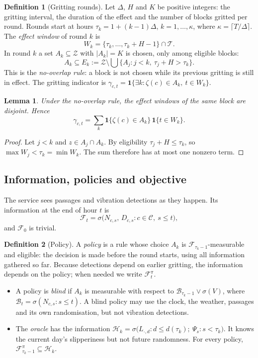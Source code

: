\documentclass[11pt,a4paper]{article}
\theoremstyle{plain}
\newtheorem{lemma}{Lemma}
\theoremstyle{definition}
\newtheorem{maaritelma}{Definition}
\theoremstyle{remark}
\newcommand{\cC}{\mathcal{C}}
\newcommand{\cZ}{\mathcal{Z}}
\newcommand{\cT}{\mathcal{T}}
\newcommand{\cF}{\mathcal{F}}
\newcommand{\cB}{\mathcal{B}}
\newcommand{\cH}{\mathcal{H}}
\newcommand{\1}{\mathbf{1}}
\begin{document}
\begin{maaritelma}[Gritting rounds]\label{maar:huolto}
Let $\Delta$, $H$ and $K$ be positive integers: the gritting interval, the
duration of the effect and the number of blocks gritted per round. Rounds start
at hours $\tau_k = 1 + (k-1)\Delta$, $k = 1, \dots, \kappa$, where
$\kappa = \lceil T/\Delta \rceil$. The \emph{effect window} of round $k$ is
\[
  W_k = \{\tau_k, \dots, \tau_k + H - 1\} \cap \cT.
\]
In round $k$ a set $A_k \subseteq \cZ$ with $|A_k| = K$ is chosen, only among
eligible blocks:
\[
  A_k \subseteq E_k := \cZ \setminus \bigcup\bigl\{A_j : j < k,\ \tau_j + H > \tau_k\bigr\}.
\]
This is the \emph{no-overlap rule}: a block is not chosen while its previous
gritting is still in effect. The gritting indicator is
$\gamma_{c,t} = \1\{\exists k : \zeta(c) \in A_k,\ t \in W_k\}$.
\end{maaritelma}

\begin{lemma}\label{le:erilliset}
Under the no-overlap rule, the effect windows of the same block are disjoint.
Hence
\[
  \gamma_{c,t} = \sum_{k} \1\{\zeta(c) \in A_k\}\, \1\{t \in W_k\}.
\]
\end{lemma}

\begin{proof}
Let $j < k$ and $z \in A_j \cap A_k$. By eligibility $\tau_j + H \le \tau_k$, so
$\max W_j < \tau_k = \min W_k$. The sum therefore has at most one nonzero term.
\end{proof}

\subsection{Information, policies and objective}

The service sees passages and vibration detections as they happen. Its
information at the end of hour $t$ is
\[
  \cF_t = \sigma\bigl(N_{c,s},\, D_{c,s} : c \in \cC,\ s \le t\bigr),
\]
and $\cF_0$ is trivial.

\begin{maaritelma}[Policy]\label{maar:politiikka}
A \emph{policy} is a rule whose choice $A_k$ is $\cF_{\tau_k - 1}$-measurable and
eligible: the decision is made before the round starts, using all information
gathered so far. Because detections depend on earlier gritting, the information
depends on the policy; when needed we write $\cF^\pi_t$.
\begin{itemize}
  \item A policy is \emph{blind} if $A_k$ is measurable with respect to
  $\cB_{\tau_k - 1} \vee \sigma(V)$, where $\cB_t = \sigma(N_{c,s} : s \le t)$.
  A blind policy may use the clock, the weather, passages and its own
  randomisation, but not vibration detections.
  \item The \emph{oracle} has the information
  $\cH_k = \sigma\bigl(L_{\cdot,d} : d \le d(\tau_k);\ \Psi_s : s < \tau_k\bigr)$.
  It knows the current day's slipperiness but not future randomness. For every
  policy, $\cF^\pi_{\tau_k - 1} \subseteq \cH_k$.
\end{itemize}
\end{maaritelma}
\end{document}
